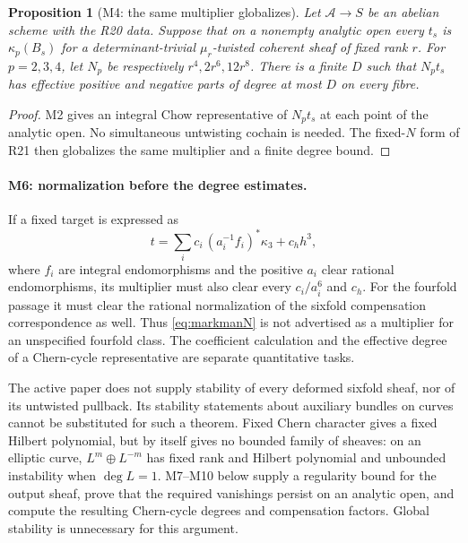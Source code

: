 \documentclass[11pt,a4paper]{article}
\newtheorem{proposition}[theorem]{Proposition}
\theoremstyle{definition}\newtheorem{definition}[theorem]{Definition}
\theoremstyle{remark}\newtheorem{remark}[theorem]{Remark}
\begin{document}
\begin{proposition}[M4: the same multiplier globalizes]\label{M4}
Let $\mathcal A\to S$ be an \emph{abelian scheme} with the R20 data. Suppose that on a nonempty analytic open every $t_s$ is $\kappa_p(B_s)$ for a determinant-trivial $\mu_r$-twisted coherent sheaf of fixed rank $r$. For $p=2,3,4$, let $N_p$ be respectively $r^4,2r^6,12r^8$. There is a finite $D$ such that $N_pt_s$ has effective positive and negative parts of degree at most $D$ on every fibre.
\end{proposition}
\begin{proof}
M2 gives an integral Chow representative of $N_pt_s$ at each point of the analytic open. No simultaneous untwisting cochain is needed. The fixed-$N$ form of R21 then globalizes the same multiplier and a finite degree bound.
\end{proof}

\paragraph{M6: normalization before the degree estimates.}
If a fixed target is expressed as
\[
 t=\sum_i c_i\,(a_i^{-1}f_i)^*\kappa_3+c_hh^3,
\]
where $f_i$ are integral endomorphisms and the positive $a_i$ clear rational endomorphisms, its multiplier must also clear every $c_i/a_i^6$ and $c_h$. For the fourfold passage it must clear the rational normalization of the sixfold compensation correspondence as well. Thus \eqref{eq:markmanN} is not advertised as a multiplier for an unspecified fourfold class. The coefficient calculation and the effective degree of a Chern-cycle representative are separate quantitative tasks.

The active paper does not supply stability of every deformed sixfold sheaf, nor of its untwisted pullback. Its stability statements about auxiliary bundles on curves cannot be substituted for such a theorem. Fixed Chern character gives a fixed Hilbert polynomial, but by itself gives no bounded family of sheaves: on an elliptic curve, $L^m\oplus L^{-m}$ has fixed rank and Hilbert polynomial and unbounded instability when $\deg L=1$. M7--M10 below supply a regularity bound for the output sheaf, prove that the required vanishings persist on an analytic open, and compute the resulting Chern-cycle degrees and compensation factors. Global stability is unnecessary for this argument.
\end{document}
